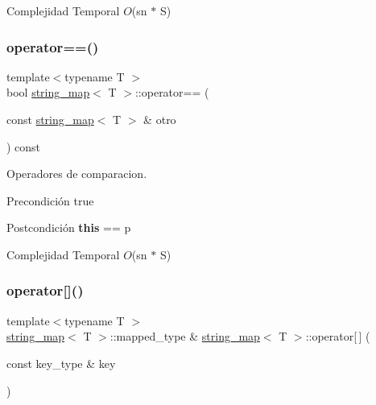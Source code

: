 \begin{DoxyDescription}
\item[Complejidad Temporal]$O$(sn $\ast$ S)
\end{DoxyDescription}\mbox{\label{classstring__map_aadca3f9b617f66163f00982b88d3a368}} 
\subsubsection{\texorpdfstring{operator==()}{operator==()}}
{\footnotesize\ttfamily template$<$typename T $>$ \\
bool \mbox{\hyperlink{classstring__map}{string\+\_\+map}}$<$ T $>$\+::operator== (\begin{DoxyParamCaption}\item[{const \mbox{\hyperlink{classstring__map}{string\+\_\+map}}$<$ T $>$ \&}]{otro }\end{DoxyParamCaption}) const}



Operadores de comparacion. 

\begin{DoxyPrecond}{Precondición}
true 
\end{DoxyPrecond}
\begin{DoxyPostcond}{Postcondición}
{\bfseries this} == p 
\begin{DoxyDescription}
\item[Complejidad Temporal]$O$(sn $\ast$ S)
\end{DoxyDescription}
\end{DoxyPostcond}
\mbox{\label{classstring__map_a82bd8d05388e69e02a75980ef759e217}} 
\subsubsection{\texorpdfstring{operator[]()}{operator[]()}}
{\footnotesize\ttfamily template$<$typename T $>$ \\
\mbox{\hyperlink{classstring__map}{string\+\_\+map}}$<$ T $>$\+::mapped\+\_\+type \& \mbox{\hyperlink{classstring__map}{string\+\_\+map}}$<$ T $>$\+::operator\mbox{[}$\,$\mbox{]} (\begin{DoxyParamCaption}\item[{const key\+\_\+type \&}]{key }\end{DoxyParamCaption})}



